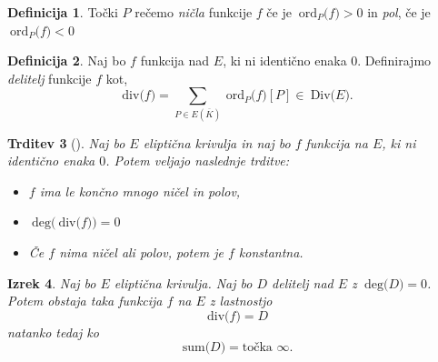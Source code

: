 \documentclass[12pt,a4paper,twoside]{article}
\theoremstyle{definition} %
\newtheorem{definicija}{Definicija}[section]
\theoremstyle{plain} %
\newtheorem{izrek}[definicija]{Izrek}
\newtheorem{trditev}[definicija]{Trditev}
\numberwithin{equation}{section}  %
\newcommand{\E}[1]{E({#1})}
\newcommand{\DIV}[1]{\ \text{Div(}{#1}\text{)}}
\newcommand{\DEG}[1]{\ \text{deg(}{#1}\text{)}}
\newcommand{\Div}[1]{\ \text{div(}{#1}\text{)}}
\newcommand{\SUM}[1]{\ \text{sum(}{#1}\text{)}}
\newcommand{\ORDp}[2]{\ \text{ord}_{#2}({#1}\text{)}}
\begin{document}
\begin{definicija}
Točki $P$ rečemo \emph{ničla} funkcije $f$ če je $\ORDp{f}{P} > 0$ in \emph{pol}, če je $\ORDp{f}{P} < 0$
\end{definicija}

\begin{definicija}
Naj bo $f$ funkcija nad $E$, ki ni identično enaka $0$. Definirajmo \emph{delitelj} funkcije $f$ kot,
$$\Div{f} = \sum_{P\in \E{\overline{K}}} \ORDp{f}{P}[P] \in \DIV{E}.$$
\end{definicija}


\begin{trditev}[]
\label{trditev 11.1}
Naj bo $E$ eliptična krivulja in naj bo $f$ funkcija na $E$, ki ni identično enaka $0$. Potem veljajo naslednje trditve:
\begin{itemize}

\item $f$ ima le končno mnogo ničel in polov,
\item $\DEG{\Div{f}}=0$
\item Če $f$ nima ničel ali polov, potem je $f$ konstantna.
\end{itemize}


\end{trditev}

\begin{izrek}
\label{izrek 11.2}
Naj bo $E$ eliptična krivulja. Naj bo $D$ delitelj nad $E$ z $\DEG{D} = 0$. Potem obstaja taka funkcija $f$ na $E$ z lastnostjo
$$\Div{f} = D$$
natanko tedaj ko
$$\SUM{D} = \text{točka }\infty.$$

\end{izrek}
\end{document}

